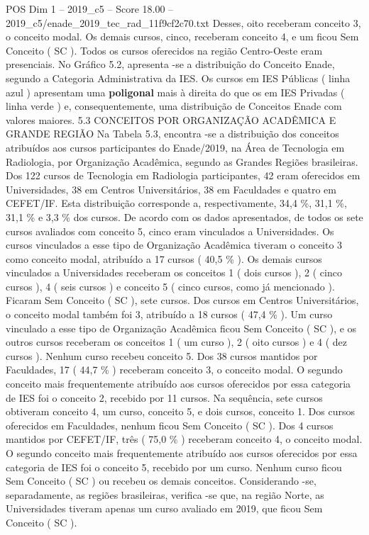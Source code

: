 \begin{textsample}{POS Dim 1 – 2019\_c5 – Score 18.00 – 2019\_c5/enade\_2019\_tec\_rad\_11f9cf2c70.txt}
Desses, oito receberam conceito 3, o conceito modal.
Os demais cursos, cinco, receberam conceito 4, e um ficou Sem Conceito ( SC ).
Todos os cursos oferecidos na região Centro-Oeste eram presenciais.
No Gráfico 5.2, apresenta -se a distribuição do Conceito Enade, segundo a Categoria Administrativa da IES.
Os cursos em IES Públicas ( linha azul ) apresentam uma \textbf{poligonal} mais à direita do que os em IES Privadas ( linha verde ) e, consequentemente, uma distribuição de Conceitos Enade com valores maiores. 5.3 CONCEITOS POR ORGANIZAÇÃO ACADÊMICA E GRANDE REGIÃO Na Tabela 5.3, encontra -se a distribuição dos conceitos atribuídos aos cursos participantes do Enade/2019, na Área de Tecnologia em Radiologia, por Organização Acadêmica, segundo as Grandes Regiões brasileiras.
Dos 122 cursos de Tecnologia em Radiologia participantes, 42 eram oferecidos em Universidades, 38 em Centros Universitários, 38 em Faculdades e quatro em CEFET/IF.
Esta distribuição corresponde a, respectivamente, 34,4 \%, 31,1 \%, 31,1 \% e 3,3 \% dos cursos.
De acordo com os dados apresentados, de todos os sete cursos avaliados com conceito 5, cinco eram vinculados a Universidades.
Os cursos vinculados a esse tipo de Organização Acadêmica tiveram o conceito 3 como conceito modal, atribuído a 17 cursos ( 40,5 \% ).
Os demais cursos vinculados a Universidades receberam os conceitos 1 ( dois cursos ), 2 ( cinco cursos ), 4 ( seis cursos ) e conceito 5 ( cinco cursos, como já mencionado ).
Ficaram Sem Conceito ( SC ), sete cursos.
Dos cursos em Centros Universitários, o conceito modal também foi 3, atribuído a 18 cursos ( 47,4 \% ).
Um curso vinculado a esse tipo de Organização Acadêmica ficou Sem Conceito ( SC ), e os outros cursos receberam os conceitos 1 ( um curso ), 2 ( oito cursos ) e 4 ( dez cursos ).
Nenhum curso recebeu conceito 5.
Dos 38 cursos mantidos por Faculdades, 17 ( 44,7 \% ) receberam conceito 3, o conceito modal.
O segundo conceito mais frequentemente atribuído aos cursos oferecidos por essa categoria de IES foi o conceito 2, recebido por 11 cursos.
Na sequência, sete cursos obtiveram conceito 4, um curso, conceito 5, e dois cursos, conceito 1.
Dos cursos oferecidos em Faculdades, nenhum ficou Sem Conceito ( SC ).
Dos 4 cursos mantidos por CEFET/IF, três ( 75,0 \% ) receberam conceito 4, o conceito modal.
O segundo conceito mais frequentemente atribuído aos cursos oferecidos por essa categoria de IES foi o conceito 5, recebido por um curso.
Nenhum curso ficou Sem Conceito ( SC ) ou recebeu os demais conceitos.
Considerando -se, separadamente, as regiões brasileiras, verifica -se que, na região Norte, as Universidades tiveram apenas um curso avaliado em 2019, que ficou Sem Conceito ( SC ).

\end{textsample}
